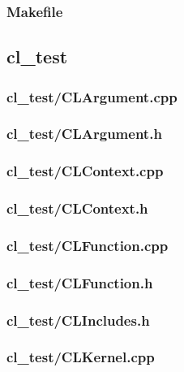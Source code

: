 \documentclass{article}
\begin{document}
\subsubsection*{Makefile}


\subsection*{cl\_test}
\subsubsection*{cl\_test/CLArgument.cpp}


\subsubsection*{cl\_test/CLArgument.h}


\subsubsection*{cl\_test/CLContext.cpp}


\subsubsection*{cl\_test/CLContext.h}


\subsubsection*{cl\_test/CLFunction.cpp}


\subsubsection*{cl\_test/CLFunction.h}


\subsubsection*{cl\_test/CLIncludes.h}


\subsubsection*{cl\_test/CLKernel.cpp}

\end{document}

